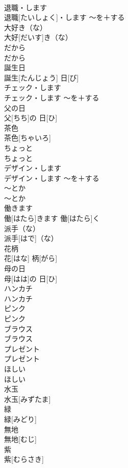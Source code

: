 \documentclass[8pt]{extreport}
\begin{document}
\begin{CJK}{UTF8}{min}
\\	退職・します	
\\	退職[たいしょく]・します	〜を＋する	
\\	大好き（な）	
\\	大好[だいす]き（な）		
\\	だから	
\\	だから		
\\	誕生日	
\\	誕生[たんじょう] 日[び]		
\\	チェック・します	
\\	チェック・します	〜を＋する	
\\	父の日	
\\	父[ちち]の 日[ひ]		
\\	茶色	
\\	茶色[ちゃいろ]		
\\	ちょっと	
\\	ちょっと		
\\	デザイン・します	
\\	デザイン・します	〜を＋する	
\\	〜とか	
\\	〜とか		
\\	働きます	
\\	働[はたら]きます	働[はたら]く	
\\	派手（な）	
\\	派手[はで]（な）		
\\	花柄	
\\	花[はな] 柄[がら]		
\\	母の日	
\\	母[はは]の 日[ひ]		
\\	ハンカチ	
\\	ハンカチ		
\\	ピンク	
\\	ピンク		
\\	ブラウス	
\\	ブラウス		
\\	プレゼント	
\\	プレゼント		
\\	ほしい	
\\	ほしい		
\\	水玉	
\\	水玉[みずたま]		
\\	緑	
\\	緑[みどり]		
\\	無地	
\\	無地[むじ]		
\\	紫	
\\	紫[むらさき]		

\end{CJK}
\end{document}
